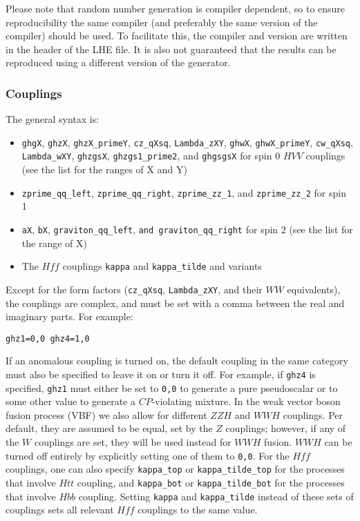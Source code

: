 \documentclass[aps,superscriptaddress,nofootinbib]{revtex4}
\begin{document}
\begin{itemize}
\begin{itemize}
Please note that random number generation is compiler dependent, so to ensure reproducibility the same compiler (and preferably the same version of the compiler) should be used.  To facilitate this, the compiler and version are written in the header of the LHE file.  It is also not guaranteed that the results can be reproduced using a different version of the generator.
\end{itemize}

\subsubsection{Couplings}
The general syntax is:
\begin{itemize}
\item \verb|ghgX|, \verb|ghzX|, \verb|ghzX_primeY|, \verb|cz_qXsq|, \verb|Lambda_zXY|, \verb|ghwX|, \verb|ghwX_primeY|, \verb|cw_qXsq|, \verb|Lambda_wXY|, \verb|ghzgsX|, \verb|ghzgs1_prime2|, and \verb|ghgsgsX| for spin 0 $HVV$ couplings (see the list for the ranges of X and Y)
\item \verb|zprime_qq_left|, \verb|zprime_qq_right|, \verb|zprime_zz_1|, and \verb|zprime_zz_2| for spin 1
\item \verb|aX|, \verb|bX|, \verb|graviton_qq_left|, \verb|and graviton_qq_right| for spin 2 (see the list for the range of X)
\item The $Hff$ couplings \verb|kappa| and \verb|kappa_tilde| and variants
\end{itemize}
Except for the form factors (\verb|cz_qXsq|, \verb|Lambda_zXY|, and their $WW$ equivalents), the couplings are complex, and must be set with a comma between the real and imaginary parts.  For example:
\begin{verbatim}
ghz1=0,0 ghz4=1,0
\end{verbatim}
If an anomalous coupling is turned on, the default coupling in the same category must also be specified to leave it on or turn it off.  For example, if \verb|ghz4| is specified, \verb|ghz1| must either be set to \verb|0,0| to generate a pure pseudoscalar or to some other value to generate a $CP$-violating mixture.
In the weak vector boson fusion process (VBF) we also allow for different $ZZH$ and $WWH$ couplings.  Per default, they are assumed to be equal, set by the $Z$ couplings; however, if any of the $W$ couplings are set, they will be used instead for $WWH$ fusion.  $WWH$ can be turned off entirely by explicitly setting one of them to \verb|0,0|.
For the $Hff$ couplings, one can also specify \verb|kappa_top| or \verb|kappa_tilde_top| for the processes that involve $Htt$ coupling, and \verb|kappa_bot| or \verb|kappa_tilde_bot| for the processes that involve $Hbb$ coupling. Setting \verb|kappa| and \verb|kappa_tilde| instead of these sets of couplings sets all relevant $Hff$ couplings to the same value.
\end{itemize}
\end{document}
